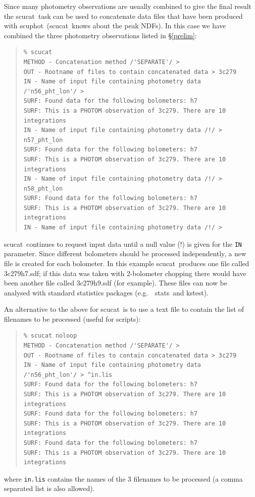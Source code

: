 \documentclass[twoside,11pt]{article}
\newcommand{\Kappa}{\xref{{\sc{Kappa}}}{sun95}{}}
\newcommand{\task}[1]{{\sf #1}}
\newcommand{\param}[1]{{\tt #1}}
\newcommand{\scuphot}{\htmlref{\task{scuphot}}{SCUPHOT}}
\newcommand{\scucat}{\htmlref{\task{scucat}}{SCUCAT}}
\newcommand{\kstest}{\xref{\task{kstest}}{sun95}{KSTEST}}
\newcommand{\stats}{\xref{\task{stats}}{sun95}{STATS}}
\newenvironment{myquote}{\begin{quote}\begin{small}}{\end{small}\end{quote}}
\newcommand{\htmlref}[2]{#1}
\newcommand{\xref}[3]{#1}
\renewcommand{\_}{\texttt{\symbol{95}}}
\begin{document}
Since many photometry observations are usually combined to give the final
result the \scucat\ task can be used to concatenate data files that have been
produced with \scuphot\ (\scucat\ knows about the \_peak NDFs). In this
case we have combined the three photometry observations listed in
\S\ref{prelim}:

\begin{myquote}
\begin{verbatim}
% scucat 
METHOD - Concatenation method /'SEPARATE'/ > 
OUT - Rootname of files to contain concatenated data > 3c279
IN - Name of input file containing photometry data /'n56_pht_lon'/ >
SURF: Found data for the following bolometers: h7
SURF: This is a PHOTOM observation of 3c279. There are 10 integrations
IN - Name of input file containing photometry data /!/ > n57_pht_lon
SURF: Found data for the following bolometers: h7
SURF: This is a PHOTOM observation of 3c279. There are 10 integrations
IN - Name of input file containing photometry data /!/ > n58_pht_lon
SURF: Found data for the following bolometers: h7
SURF: This is a PHOTOM observation of 3c279. There are 10 integrations
IN - Name of input file containing photometry data /!/ > 
\end{verbatim}
\end{myquote}

\scucat\ continues to request input data until a null value (!) is given for
the \param{IN} parameter. Since different bolometers should be processed
independently, a new file is created for each bolometer. In this example
\scucat\ produces one file called 3c279\_h7.sdf; if this data was taken with
2-bolometer chopping there would have been another file called 3c279\_h9.sdf
(for example). These files can now be analysed with standard statistics
packages (e.g.\ \Kappa\ \stats\ and \kstest).

An alternative to the above for \scucat\ is to use a text file to contain
the list of filenames to be processed (useful for scripts):
\begin{myquote}
\begin{verbatim}
% scucat noloop
METHOD - Concatenation method /'SEPARATE'/ > 
OUT - Rootname of files to contain concatenated data > 3c279
IN - Name of input file containing photometry data /'n56_pht_lon'/ > ^in.lis
SURF: Found data for the following bolometers: h7
SURF: This is a PHOTOM observation of 3c279. There are 10 integrations
SURF: Found data for the following bolometers: h7
SURF: This is a PHOTOM observation of 3c279. There are 10 integrations
SURF: Found data for the following bolometers: h7
SURF: This is a PHOTOM observation of 3c279. There are 10 integrations
\end{verbatim}
\end{myquote}
where \texttt{in.lis} contains the names of the 3 filenames to be
processed (a comma separated list is also allowed).
\end{document}
